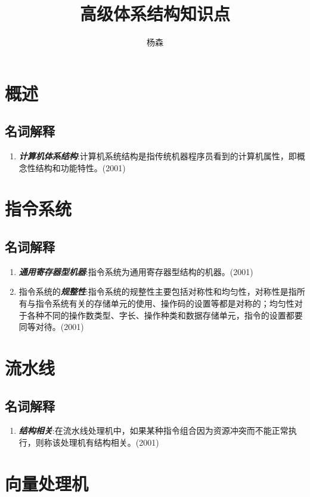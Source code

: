 \documentclass[a4paper]{ctexart}
\begin{document}
\title{高级体系结构知识点}
\author{杨森}
\maketitle

\section{概述}
\subsection{名词解释}
\begin{enumerate}
  \item \emph{\textbf{计算机体系结构}}:计算机系统结构是指传统机器程序员看到的计算机属性，即概念性结构和功能特性。(2001)
  
\end{enumerate}

\section{指令系统}
\subsection{名词解释}
\begin{enumerate}
  \item \emph{\textbf{通用寄存器型机器}}:指令系统为通用寄存器型结构的机器。(2001)
  \item 指令系统的\emph{\textbf{规整性}}:指令系统的规整性主要包括对称性和均匀性，对称性是指所有与指令系统有关的存储单元的使用、操作码的设置等都是对称的；均匀性对于各种不同的操作数类型、字长、操作种类和数据存储单元，指令的设置都要同等对待。(2001)
\end{enumerate}

\section{流水线}
\subsection{名词解释}
\begin{enumerate}
  \item \emph{\textbf{结构相关}}:在流水线处理机中，如果某种指令组合因为资源冲突而不能正常执行，则称该处理机有结构相关。(2001)
\end{enumerate}


\section{向量处理机}
\end{document}

